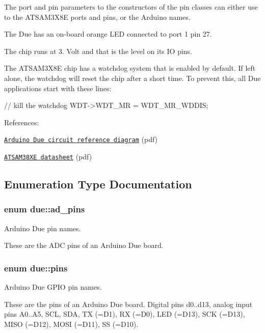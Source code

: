The port and pin parameters to the constructors of the pin classes can either use to the A\+T\+S\+A\+M3\+X8E ports and pins, or the Arduino names.

The Due has an on-\/board orange L\+ED connected to port 1 pin 27.

The chip runs at 3. Volt and that is the level on its IO pins.



The A\+T\+S\+A\+M3\+X8E chip has a watchdog system that is enabled by default. If left alone, the watchdog will reset the chip after a short time. To prevent this, all Due applications start with these lines\+: 
\begin{DoxyCode}
\textcolor{comment}{// kill the watchdog}
WDT->WDT\_MR = WDT\_MR\_WDDIS;
\end{DoxyCode}


References\+:
\begin{DoxyItemize}
\item \href{https://www.arduino.cc/en/uploads/Main/arduino-uno-schematic.pdf}{\tt Arduino Due circuit reference diagram} (pdf)
\item \href{http://www.atmel.com/images/atmel-11057-32-bit-cortex-m3-microcontroller-sam3x-sam3a_datasheet.pdf}{\tt A\+T\+S\+A\+M38\+XE datasheet} (pdf) 
\end{DoxyItemize}

\subsection{Enumeration Type Documentation}
\subsubsection[{\texorpdfstring{ad\+\_\+pins}{ad_pins}}]{\setlength{\rightskip}{0pt plus 5cm}enum {\bf due\+::ad\+\_\+pins}\hspace{0.3cm}{\ttfamily [strong]}}\hypertarget{namespacedue_a5ecc98d40585c91eabbfb14f71bd7d4c}{}\label{namespacedue_a5ecc98d40585c91eabbfb14f71bd7d4c}


Arduino Due pin names. 

These are the A\+DC pins of an Arduino Due board. 
\subsubsection[{\texorpdfstring{pins}{pins}}]{\setlength{\rightskip}{0pt plus 5cm}enum {\bf due\+::pins}\hspace{0.3cm}{\ttfamily [strong]}}\hypertarget{namespacedue_a8ffa3ec309934ff9db34317e504bcc92}{}\label{namespacedue_a8ffa3ec309934ff9db34317e504bcc92}


Arduino Due G\+P\+IO pin names. 

These are the pins of an Arduino Due board. Digital pins d0..d13, analog input pins A0..A5, S\+CL, S\+DA, TX (=D1), RX (=D0), L\+ED (=D13), S\+CK (=D13), M\+I\+SO (=D12), M\+O\+SI (=D11), SS (=D10). 